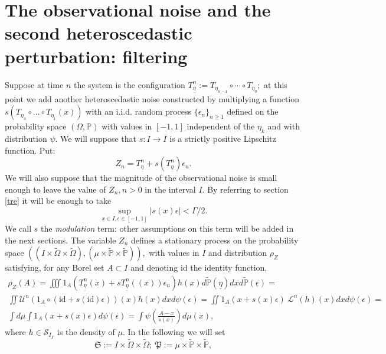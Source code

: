 \documentclass{article}
\newcommand{\etam}{\underline{\eta}}
\newcommand{\1}{\mathbbm{1}}
\begin{document}
\section{The observational noise and the second heteroscedastic perturbation: filtering}\label{filll}
Suppose at time $n$ the system is the configuration $T^n_{\etam}:=T_{\eta_{n-1}}\circ\cdots\circ T_{\eta_0};$ at this point we add another heteroscedastic noise constructed by multiplying a function $s(T_{\eta_n} \circ\ldots\circ T_{\eta_1}(x))$ with an i.i.d. random process  $\{\epsilon_n\}_{n\ge 1}$ defined on the probability space $(\Omega, \mathbb{P})$ with values in $[-1,1]$ independent of the $\eta_k$ and with distribution $\psi.$ We will suppose that   $s:I\rightarrow I$ is a strictly positive Lipschitz function. Put:
\begin{equation}\label{rfu}
Z_n=T^n_{\etam}+s(T^n_{\etam})\epsilon_n.
\end{equation}
We will also suppose that the magnitude of the observational noise  is small enough to leave the value of $Z_n, n>0$ in the interval $I.$ By referring to section \ref{tre} it will  be enough to take
\begin{equation}\label{56}
\sup_{x\in I, \epsilon\in [-1,1]}|s(x)\epsilon|<\Gamma/2.
\end{equation}
 We call $s$ the {\em modulation} term: other assumptions on this term will be added in the next sections.
The variable $Z_n$ defines a stationary process on the probability space $\left((I\times \tilde{\Omega}\times \tilde{\Omega}), (\mu\times \tilde{\mathbb{P}}\times \tilde{\mathbb{P}})\right),$ with values in $I$ and distribution
$
\rho_{Z}
$ satisfying, for any Borel set $A\subset I$ and denoting $\text{id}$ the identity function,
\begin{eqnarray}
\rho_{Z}(A)=\iiint 1_A(T^n_{\etam}(x)+sT^n_{\etam}((x))\epsilon_n)h(x)d\tilde{\mathbb{P}}(\etam)dx d\tilde{\mathbb{P}}(\underline{\epsilon})=\\
\iint \mathcal{U}^n(1_A\circ (\text{id}+s(\text{id})\epsilon)) (x)h(x)dxd\psi(\epsilon)=
\iint 1_A(x+s(x)\epsilon)\ \mathcal{L}^n(h)(x)dxd\psi(\epsilon)=\\
\int d\mu\int 1_A(x+s(x)\epsilon)d\psi(\epsilon)=\int \psi\left(\frac{A-x}{s(x)}\right)d\mu(x),
\end{eqnarray}
where $h\in \mathcal{S}_{I_{\Gamma}}$ is the density of $\mu.$ In the following we will set
$$
\mathfrak{S}:=I\times \tilde{\Omega}\times \tilde{\Omega}; \ \mathfrak{P}:=\mu\times \tilde{\mathbb{P}}\times \tilde{\mathbb{P}},
$$
\end{document}
